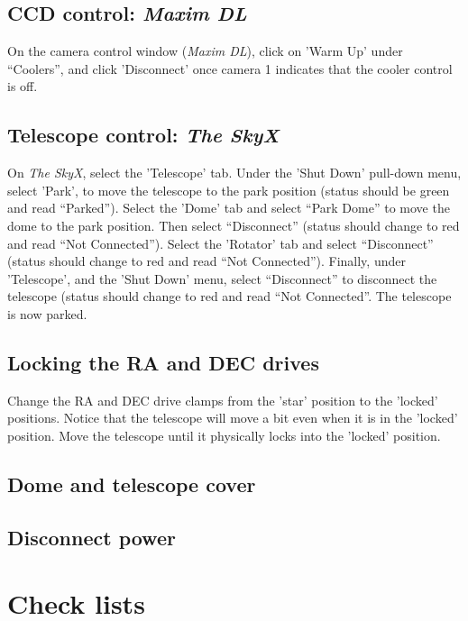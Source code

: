 \documentclass[12pt,twoside,a4paper]{report}
\begin{document}
\subsection{CCD control: \emph{Maxim DL}}

On the camera control window (\emph{Maxim DL}), click on 'Warm Up' under ``Coolers'', and click 'Disconnect' once camera 1
indicates that the cooler control is off.

\subsection{Telescope control: \emph{The SkyX}}

On \emph{The SkyX}, select the 'Telescope' tab. Under the 'Shut Down' pull-down menu, select 'Park', to 
move the telescope to the park position (status should be green and read ``Parked''). 
Select the 'Dome' tab and select ``Park Dome'' to move the dome to the park position. Then select 
``Disconnect'' (status should change to red and read ``Not Connected'').
Select the 'Rotator' tab and select ``Disconnect'' (status should change to red and read ``Not Connected'').
Finally, under 'Telescope', and the 'Shut Down' menu, select ``Disconnect'' to disconnect the telescope (status
should change to red and read ``Not Connected''. The telescope is now parked.

\subsection{Locking the RA and DEC drives}

Change the RA and DEC drive clamps from the 'star' position to the 'locked' positions. 
Notice that the telescope will move a bit even when it is in the 'locked' position. Move the
telescope until it physically locks into the 'locked' position.

\subsection{Dome and telescope cover}

\subsection{Disconnect power}


\section{Check lists}
\label{checklists}
\end{document}

